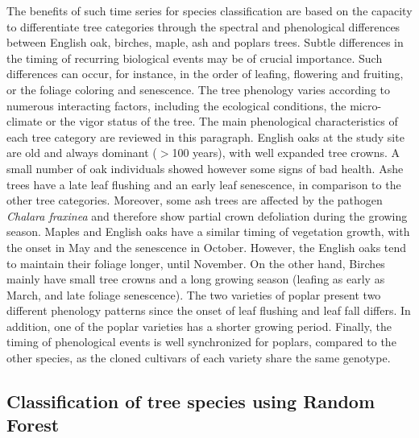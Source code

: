 \documentclass[remotesensing,article,submit,moreauthors,pdftex,12pt,a4paper]{mdpi} %
\begin{document}
The benefits of such time series for species classification are based on the capacity to differentiate tree categories through the spectral and phenological differences between English oak, birches, maple, ash and poplars trees. 
Subtle differences in the timing of recurring biological events may be of crucial importance. 
Such differences can occur, for instance, in the order of leafing, flowering and fruiting, or the foliage coloring and senescence. 
The tree phenology varies according to numerous interacting factors, including the ecological conditions, the micro-climate or the vigor status of the tree.
The main phenological characteristics of each tree category are reviewed in this paragraph. 
English oaks at the study site are old and always dominant ($>$100 years), with well expanded tree crowns.
A small number of oak individuals showed however some signs of bad health. 
Ashe trees have a late leaf flushing and an early leaf senescence, in comparison to the other tree categories. 
Moreover, some ash trees are affected by the pathogen \textit{Chalara fraxinea} \cite{husson_chalara_2011} and therefore show partial crown defoliation during the growing season. 
Maples and English oaks have a similar timing of vegetation growth, with the onset in May and the senescence in October. 
However, the English oaks tend to maintain their foliage longer, until November. 
On the other hand, Birches mainly have small tree crowns and a long growing season (leafing as early as March, and late foliage senescence). 
The two varieties of poplar present two different phenology patterns since the onset of leaf flushing and leaf fall differs. 
In addition, one of the poplar varieties has a shorter growing period.
Finally, the timing of phenological events is well synchronized for poplars, compared to the other species, as the cloned cultivars of each variety share the same genotype.


\subsection{Classification of tree species using Random Forest}
\end{document}
